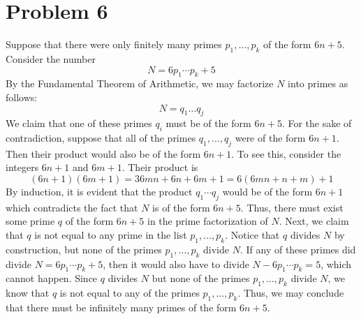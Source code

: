 \documentclass[12pt]{article}
\begin{document}
\section*{Problem 6}
Suppose that there were only finitely many primes $p_1,\ldots,p_k$ of the form $6n+5$. Consider the number
\[
N = 6p_1\cdots p_k + 5
\] By the Fundamental Theorem of Arithmetic, we may factorize $N$ into primes as follows:
\[
N = q_1\ldots q_j
\] We claim that one of these primes $q_i$ must be of the form $6n+5$. For the sake of contradiction, suppose that all of the primes $q_1,\ldots,q_j$ were of the form $6n+1$. Then their product would also be of the form $6n+1$. To see this, consider the integers $6n+1$ and $6m+1$. Their product is
\[
(6n+1)(6m+1) = 36mn + 6n + 6m + 1 = 6(6mn + n + m) + 1
\] By induction, it is evident that the product $q_1\cdots q_j$ would be of the form $6n+1$ which contradicts the fact that $N$ is of the form $6n+5$. Thus, there must exist some prime $q$ of the form $6n+5$ in the prime factorization of $N$. Next, we claim that $q$ is not equal to any prime in the list $p_1,\ldots,p_k$. Notice that $q$ divides $N$ by construction, but none of the primes $p_1,\ldots,p_k$ divide $N$. If any of these primes did divide $N = 6p_1\cdots p_k + 5$, then it would also have to divide $N - 6p_1\cdots p_k = 5$, which cannot happen. Since $q$ divides $N$ but none of the primes $p_1,\ldots,p_k$ divide $N$, we know that $q$ is not equal to any of the primes $p_1,\ldots,p_k$. Thus, we may conclude that there must be infinitely many primes of the form $6n+5$.
\newpage
\end{document}

